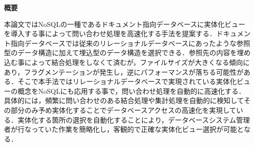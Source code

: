 \documentclass[a4paper,11pt]{ujreport}
\begin{document}
\begin{center}
	{\bf 概要}
	\vspace{5mm}
\end{center}
本論文ではNoSQLの一種であるドキュメント指向データベースに実体化ビューを導入する事によって問い合わせ処理を高速化する手法を提案する．ドキュメント指向データベースでは従来のリレーショナルデータベースにあったような参照型のデータ構造に加えて埋込型のデータ構造を選択できる．参照先の内容を埋め込む事によって結合処理をしなくて済むが，ファイルサイズが大きくなる傾向にあり，フラグメンテーションが発生し，逆にパフォーマンスが落ちる可能性がある．そこで本手法ではリレーショナルデータベースで実現されている実体化ビューの概念をNoSQLにも応用する事で，問い合わせ処理を自動的に高速化する．具体的には，頻繁に問い合わせのある結合処理や集計処理を自動的に検知してその部分のみ予め実体化することでデータベースアクセスの高速化を実現している．実体化する箇所の選択を自動化することにより，データベースシステム管理者が行なっていた作業を簡略化し，客観的で正確な実体化ビュー選択が可能となる．
\end{document}
